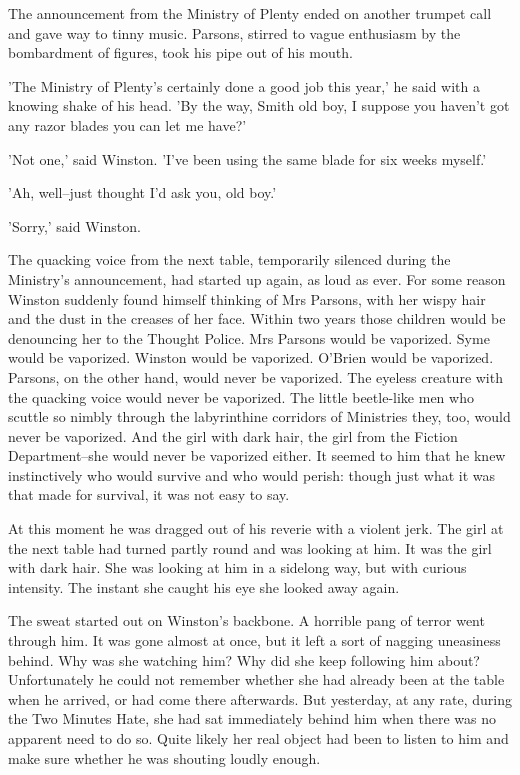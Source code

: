 \documentclass{article}
\begin{document}
The announcement from the Ministry of Plenty ended on another trumpet call
and gave way to tinny music. Parsons, stirred to vague enthusiasm by the
bombardment of figures, took his pipe out of his mouth.

'The Ministry of Plenty's certainly done a good job this year,' he said
with a knowing shake of his head. 'By the way, Smith old boy, I suppose
you haven't got any razor blades you can let me have?'

'Not one,' said Winston. 'I've been using the same blade for six weeks
myself.'

'Ah, well--just thought I'd ask you, old boy.'

'Sorry,' said Winston.

The quacking voice from the next table, temporarily silenced during the
Ministry's announcement, had started up again, as loud as ever. For some
reason Winston suddenly found himself thinking of Mrs Parsons, with her
wispy hair and the dust in the creases of her face. Within two years those
children would be denouncing her to the Thought Police. Mrs Parsons would
be vaporized. Syme would be vaporized. Winston would be vaporized. O'Brien
would be vaporized. Parsons, on the other hand, would never be vaporized.
The eyeless creature with the quacking voice would never be vaporized.
The little beetle-like men who scuttle so nimbly through the labyrinthine
corridors of Ministries they, too, would never be vaporized. And the girl
with dark hair, the girl from the Fiction Department--she would never be
vaporized either. It seemed to him that he knew instinctively who would
survive and who would perish: though just what it was that made for
survival, it was not easy to say.

At this moment he was dragged out of his reverie with a violent jerk. The
girl at the next table had turned partly round and was looking at him. It
was the girl with dark hair. She was looking at him in a sidelong way, but
with curious intensity. The instant she caught his eye she looked away
again.

The sweat started out on Winston's backbone. A horrible pang of terror
went through him. It was gone almost at once, but it left a sort of nagging
uneasiness behind. Why was she watching him? Why did she keep following him
about? Unfortunately he could not remember whether she had already been at
the table when he arrived, or had come there afterwards. But yesterday, at
any rate, during the Two Minutes Hate, she had sat immediately behind him
when there was no apparent need to do so. Quite likely her real object had
been to listen to him and make sure whether he was shouting loudly enough.
\end{document}
